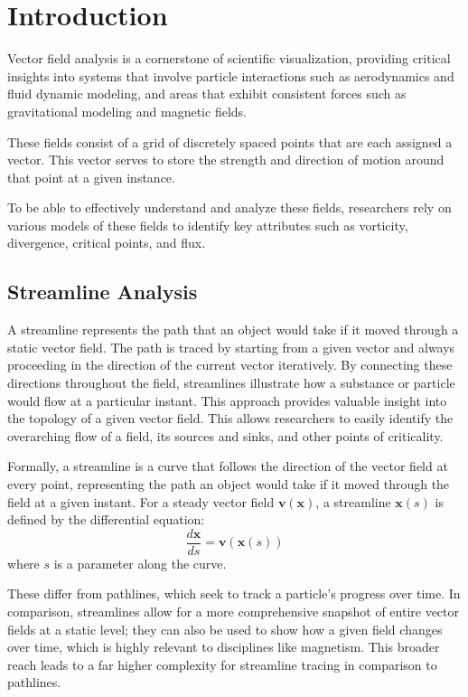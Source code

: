 \section{Introduction}

Vector field analysis is a cornerstone of scientific visualization, providing critical insights into systems that involve particle interactions such as aerodynamics and fluid dynamic modeling, and areas that exhibit consistent forces such as gravitational modeling and magnetic fields.

These fields consist of a grid of discretely spaced points that are each assigned a vector.
This vector serves to store the strength and direction of motion around that point at a given instance.

To be able to effectively understand and analyze these fields, researchers rely on various models of these fields to identify key attributes such as vorticity, divergence, critical points, and flux.


\subsection{Streamline Analysis}

A streamline represents the path that an object would take if it moved through a static vector field. The path is traced by starting from a given vector and always proceeding in the direction of the current vector iteratively.
By connecting these directions throughout the field, streamlines illustrate how a substance or particle would flow at a particular instant.
This approach provides valuable insight into the topology of a given vector field.
This allows researchers to easily identify the overarching flow of a field, its sources and sinks, and other points of criticality.

Formally, a streamline is a curve that follows the direction of the vector field at every point, representing the path an object would take if it moved through the field at a given instant. For a steady vector field $\mathbf{v}(\mathbf{x})$, a streamline $\mathbf{x}(s)$ is defined by the differential equation:
\begin{equation}
	\frac{d\mathbf{x}}{ds} = \mathbf{v}(\mathbf{x}(s))
\end{equation}
where $s$ is a parameter along the curve.

These differ from pathlines, which seek to track a particle's progress over time.
In comparison, streamlines allow for a more comprehensive snapshot of entire vector fields at a static level; they can also be used to show how a given field changes over time, which is highly relevant to disciplines like magnetism.
This broader reach leads to a far higher complexity for streamline tracing in comparison to pathlines.

